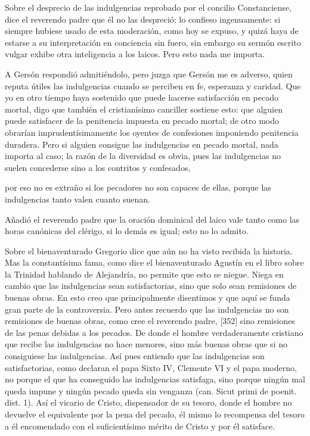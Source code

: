 Sobre el desprecio de las indulgencias reprobado por el concilio Constanciense, dice el reverendo padre que él no las despreció; lo confieso ingenuamente: si siempre hubiese usado de esta moderación, como hoy se expuso, y quizá haya de estarse a su interpretación en conciencia sin fuero, sin embargo su sermón escrito vulgar exhibe otra inteligencia a los laicos. Pero esto nada me importa.

A Gersón respondió admitiéndolo, pero juzga que Gersón me es adverso, quien reputa útiles las indulgencias cuando se perciben en fe, esperanza y caridad. Que yo en otro tiempo haya sostenido que puede hacerse satisfacción en pecado mortal, digo que también el cristianísimo canciller sostiene esto: que alguien puede satisfacer de la penitencia impuesta en pecado mortal; de otro modo obrarían imprudentísimamente los oyentes de confesiones imponiendo penitencia duradera. Pero si alguien consigue las indulgencias en pecado mortal, nada importa al caso; la razón de la diversidad es obvia, pues las indulgencias no suelen concederse sino a los contritos y confesados,

por eso no es extraño si los pecadores no son capaces de ellas, porque las indulgencias tanto valen cuanto suenan.

Añadió el reverendo padre que la oración dominical del laico vale tanto como las horas canónicas del clérigo, si lo demás es igual; esto no lo admito.

Sobre el bienaventurado Gregorio dice que aún no ha visto recibida la historia. Mas la constantísima fama, como dice el bienaventurado Agustín en el libro sobre la Trinidad hablando de Alejandría, no permite que esto se niegue. Niega en cambio que las indulgencias sean satisfactorias, sino que solo sean remisiones de buenas obras. En esto creo que principalmente disentimos y que aquí se funda gran parte de la controversia. Pero antes recuerdo que las indulgencias no son remisiones de buenas obras, como cree el reverendo padre, [352] sino remisiones de las penas debidas a los pecados. De donde el hombre verdaderamente cristiano que recibe las indulgencias no hace menores, sino más buenas obras que si no consiguiese las indulgencias. Así pues entiendo que las indulgencias son satisfactorias, como declaran el papa Sixto IV, Clemente VI y el papa moderno, no porque el que ha conseguido las indulgencias satisfaga, sino porque ningún mal queda impune y ningún pecado queda sin venganza (can. Sicut primi de poenit. dist. 1). Así el vicario de Cristo, dispensador de su tesoro, donde el hombre no devuelve el equivalente por la pena del pecado, él mismo lo recompensa del tesoro a él encomendado con el suficientísimo mérito de Cristo y por él satisface.

